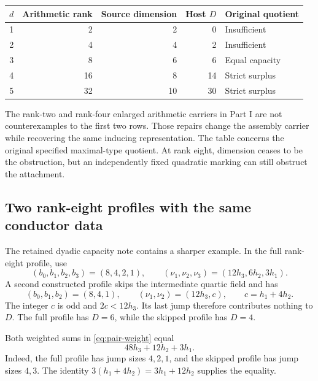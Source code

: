 \begin{center}\begin{tabular}{rrrrl}\toprule
$d$ & Arithmetic rank & Source dimension & Host $D$ & Original quotient\\\midrule
1 & 2 & 2 & 0 & Insufficient\\
2 & 4 & 4 & 2 & Insufficient\\
3 & 8 & 6 & 6 & Equal capacity\\
4 & 16 & 8 & 14 & Strict surplus\\
5 & 32 & 10 & 30 & Strict surplus\\\bottomrule
\end{tabular}\end{center}

The rank-two and rank-four enlarged arithmetic carriers in Part I are not counterexamples to the first two rows. Those repairs change the assembly carrier while recovering the same inducing representation. The table concerns the original specified maximal-type quotient. At rank eight, dimension ceases to be the obstruction, but an independently fixed quadratic marking can still obstruct the attachment.

\subsection{Two rank-eight profiles with the same conductor data}
The retained dyadic capacity note contains a sharper example. In the full rank-eight profile, use
\[
 (b_0,b_1,b_2,b_3)=(8,4,2,1),
 \qquad (\nu_1,\nu_2,\nu_3)=(12h_3,6h_2,3h_1).
\]
A second constructed profile skips the intermediate quartic field and has
\[
 (b_0,b_1,b_2)=(8,4,1),
 \qquad (\nu_1,\nu_2)=(12h_3,c),\qquad c=h_1+4h_2.
 \tag{24.6}\label{eq:skip}
\]
The integer $c$ is odd and $2c<12h_3$. Its last jump therefore contributes nothing to $D$. The full profile has $D=6$, while the skipped profile has $D=4$.

Both weighted sums in \eqref{eq:pair-weight} equal
\[
 48h_3+12h_2+3h_1.
 \tag{24.7}\label{eq:sameweight}
\]
Indeed, the full profile has jump sizes $4,2,1$, and the skipped profile has jump sizes $4,3$. The identity $3(h_1+4h_2)=3h_1+12h_2$ supplies the equality.

